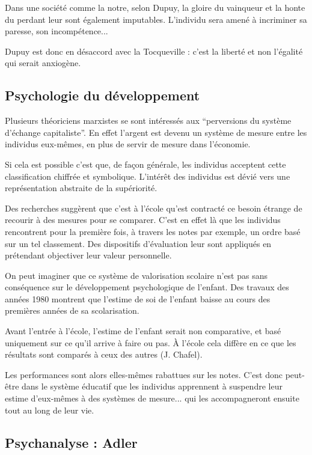 	Dans une société comme la notre, selon Dupuy, la gloire du vainqueur et la honte du perdant leur sont également imputables.
	L'individu sera amené à incriminer sa paresse, son incompétence...

	Dupuy est donc en désaccord avec la Tocqueville : c'est la liberté et non l'égalité qui serait anxiogène.

\subsection{Psychologie du développement}

	Plusieurs théoriciens marxistes se sont intéressés aux “perversions du système d'échange capitaliste”.
	En effet l'argent est devenu un système de mesure entre les individus eux-mêmes, en plus de servir de mesure dans l'économie.

	Si cela est possible c'est que, de façon générale, les individus acceptent cette classification chiffrée et symbolique.
	L'intérêt des individus est dévié vers une représentation abstraite de la supériorité.

	Des recherches suggèrent que c'est à l'école qu'est contracté ce besoin étrange de recourir à des mesures pour se comparer.
	C'est en effet là que les individus rencontrent pour la première fois, à travers les notes par exemple, un ordre basé sur un tel classement.
	Des dispositifs d’évaluation leur sont appliqués en prétendant objectiver leur valeur personnelle. 

	On peut imaginer que ce système de valorisation scolaire n'est pas sans conséquence sur le développement psychologique de l'enfant.
	Des travaux des années 1980 montrent que l'estime de soi de l'enfant baisse au cours des premières années de sa scolarisation.

	Avant l'entrée à l'école, l'estime de l'enfant serait non comparative, et basé uniquement sur ce qu'il arrive à faire ou pas.
	À l'école cela diffère en ce que les résultats sont comparés à ceux des autres (J. Chafel).

	Les performances sont alors elles-mêmes rabattues sur les notes.
	C’est donc peut-être dans le système éducatif que les individus apprennent à suspendre leur estime d’eux-mêmes à des systèmes de mesure... qui les accompagneront ensuite tout au long de leur vie.

\subsection{Psychanalyse : Adler}

